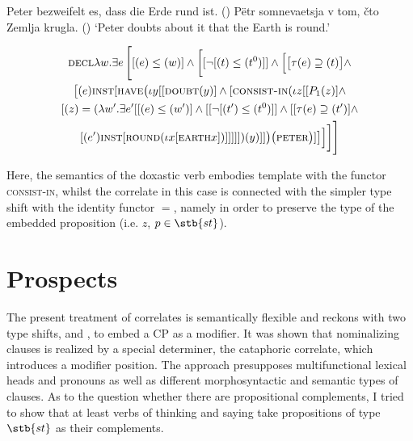\documentclass[output=paper]{langscibook}
\begin{document}
\ea \label{ex:zimmermann:35}
    \ea  Peter bezweifelt es, dass die Erde rund ist. \hfill ()\label{ex:zimmermann:35a}
    \ex Pëtr somnevaetsja v tom, čto Zemlja krugla. \hfill ()\label{ex:zimmermann:35b}
    \z
    \glt `Peter doubts about it that the Earth is round.'
\z

\begin{multline}\label{ex:zimmermann:36}
\textsc{decl} \lambda w . \exists e \, \Bigg[[(e) \leq (w)] \wedge \bigg[[\lnot[(t) \leq (t^{0})]] \wedge \Big[\big[\tau (e) \supseteq (t)\big] \wedge \\
\big[(e) \textsc{inst} [\textsc{have} \big(\iota y [[\textsc{doubt} (y)] \wedge [\textsc{consist-in} (\iota z [[P_1 (z)] \wedge \\ 
[(z) = (\lambda w'.\exists e' [[(e) \leq (w')] \wedge [[\lnot[(t') \leq (t^{0})]] \wedge [[\tau(e) \supseteq (t')] \wedge \\
[(e') \textsc{inst} [\textsc{round} (\iota x [\textsc{earth} x])]]]]]) (y)]]\big) \big(\textsc{peter}\big)]\big]\Big]\bigg]\Bigg]
\end{multline}

\noindent Here, the semantics of the doxastic verb embodies template  with the functor \textsc{consist-in}, whilst the correlate in this case is connected with the simpler type shift  with the identity functor $=$, namely in order to preserve the type of the embedded proposition (i.e. $z$, $p \in \stb{st}$).


\section{Prospects}\label{s:3}

The present treatment of correlates is semantically flexible and reckons with two type shifts,  and , to embed a CP as a modifier. It was shown that nominalizing clauses is realized by a special determiner, the cataphoric correlate, which introduces a modifier position. The approach presupposes multifunctional lexical heads and pronouns as well as different morphosyntactic and semantic types of clauses. As to the question whether there are propositional complements, I tried to show that at least verbs of thinking and saying take propositions of type $\stb{st}$ as their complements.
\end{document}
